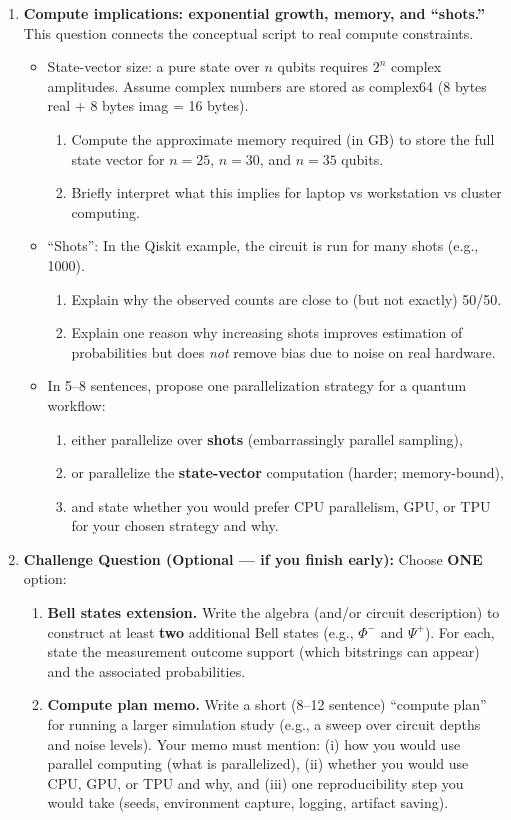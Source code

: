\documentclass[11pt]{article}
\begin{document}
\begin{enumerate}
\item \textbf{Compute implications: exponential growth, memory, and ``shots.''}
This question connects the conceptual script to real compute constraints.
\begin{itemize}
  \item State-vector size: a pure state over $n$ qubits requires $2^n$ complex amplitudes. Assume complex numbers are stored as complex64 (8 bytes real + 8 bytes imag = 16 bytes).
  \begin{enumerate}
    \item Compute the approximate memory required (in GB) to store the full state vector for $n=25$, $n=30$, and $n=35$ qubits.
    \item Briefly interpret what this implies for laptop vs workstation vs cluster computing.
  \end{enumerate}
  \item ``Shots'': In the Qiskit example, the circuit is run for many shots (e.g., 1000).
  \begin{enumerate}
    \item Explain why the observed counts are close to (but not exactly) 50/50.
    \item Explain one reason why increasing shots improves estimation of probabilities but does \emph{not} remove bias due to noise on real hardware.
  \end{enumerate}
  \item In 5--8 sentences, propose one parallelization strategy for a quantum workflow:
  \begin{enumerate}
    \item either parallelize over \textbf{shots} (embarrassingly parallel sampling),
    \item or parallelize the \textbf{state-vector} computation (harder; memory-bound),
    \item and state whether you would prefer CPU parallelism, GPU, or TPU for your chosen strategy and why.
  \end{enumerate}
\end{itemize}

\item \textbf{Challenge Question (Optional --- if you finish early):}
Choose \textbf{ONE} option:
\begin{enumerate}
  \item \textbf{Bell states extension.} Write the algebra (and/or circuit description) to construct at least \textbf{two} additional Bell states (e.g., $\Phi^-$ and $\Psi^+$). For each, state the measurement outcome support (which bitstrings can appear) and the associated probabilities.
  \item \textbf{Compute plan memo.} Write a short (8--12 sentence) ``compute plan'' for running a larger simulation study (e.g., a sweep over circuit depths and noise levels). Your memo must mention: (i) how you would use parallel computing (what is parallelized), (ii) whether you would use CPU, GPU, or TPU and why, and (iii) one reproducibility step you would take (seeds, environment capture, logging, artifact saving).
\end{enumerate}

\end{enumerate}
\end{document}
